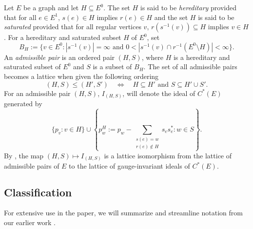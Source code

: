 \documentclass[12pt]{amsbook}%
\theoremstyle{defin}
\theoremstyle{remark}
\numberwithin{equation}{chapter}
\numberwithin{theor}{section}
\begin{document}
  Let $E$ be a graph and let $H \subseteq E^0$.   The set $H$ is said to be \emph{hereditary} provided that for all $e \in E^1$, $s(e) \in H$ implies $r(e) \in H$ and the set $H$ is  said to be \emph{saturated} provided that for all regular vertices $v$, $r(s^{-1}(v)) \subseteq H$ implies $v \in H$.  For a hereditary and saturated subset $H$ of $E^0$, set 
$$
B_H := \{ v \in E^0 : | s^{-1}(v)|=\infty \text{ and } 0 < | s^{-1}(v) \cap r^{-1}(E^0 \setminus H)| < \infty\}.
$$
An \emph{admissible pair} is an ordered pair $(H,S)$, where $H$ is a hereditary and saturated subset of $E^0$ and $S$ is a subset of $B_H$.  The set of all admissible pairs becomes a lattice when given the following ordering 
$$
(H, S) \leq (H',S') \quad \iff \quad H \subseteq H' \text{ and } S \subseteq H' \cup S'.
$$
For an admissible pair $(H,S)$, $I_{(H,S)}$, will denote the ideal of $C^*(E)$ generated by 
$$
\{ p_v: v \in H\} \cup \left\{ p_w^H := p_w - \sum_{ \substack{ s(e)=w \\ r(e) \notin H }} s_e s_e^* : w \in S\right\}.
$$
By \cite[Theorem~3.6 and Corollary~3.10]{bhrs:iccig}, the map $(H,S) \mapsto I_{(H,S)}$ is a lattice isomorphism from the lattice of admissible pairs of $E$ to the lattice of gauge-invariant ideals of $C^*(E)$.





\subsection{Classification}\label{classummary}

For extensive use in the paper, we will summarize and streamline notation from our earlier work 
 \cite{segrerapws:ccuggs,segrerapws:gcgcfg}. 
 
\end{document}
